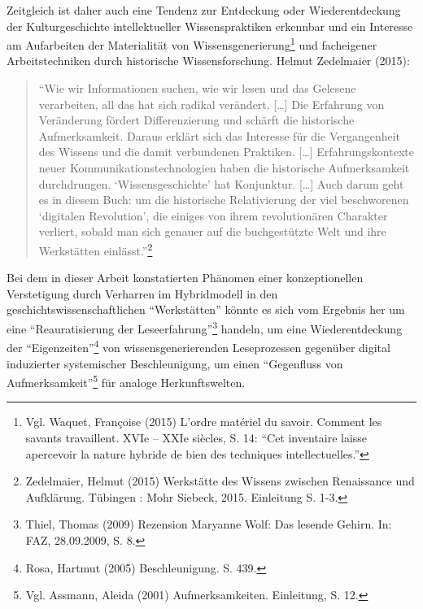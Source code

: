 \documentclass[a4paper,
fontsize=11pt,
oneside,
numbers=noperiodatend,
parskip=half-,
bibliography=totoc,
final
]{scrartcl}
\begin{document}
Zeitgleich ist daher auch eine Tendenz zur Entdeckung oder
Wiederentdeckung der Kulturgeschichte intellektueller Wissenspraktiken
erkennbar und ein Interesse am Aufarbeiten der Materialität von
Wissensgenerierung\footnote{Vgl. Waquet, Françoise (2015) L'ordre
  matériel du savoir. Comment les savants travaillent. XVIe -- XXIe
  siècles, S. 14: \enquote{Cet inventaire laisse apercevoir la nature
  hybride de bien des techniques intellectuelles.}} und facheigener
Arbeitstechniken durch historische Wissensforschung. Helmut Zedelmaier
(2015):

\begin{quote}
\enquote{Wie wir Informationen suchen, wie wir lesen und das Gelesene
verarbeiten, all das hat sich radikal verändert. {[}\ldots{}{]} Die
Erfahrung von Veränderung fördert Differenzierung und schärft die
historische Aufmerksamkeit. Daraus erklärt sich das Interesse für die
Vergangenheit des Wissens und die damit verbundenen Praktiken.
{[}\ldots{}{]} Erfahrungskontexte neuer Kommunikationstechnologien haben
die historische Aufmerksamkeit durchdrungen. \enquote{Wissensgeschichte}
hat Konjunktur. {[}\ldots{}{]} Auch darum geht es in diesem Buch: um die
historische Relativierung der viel beschworenen \enquote{digitalen
Revolution}, die einiges von ihrem revolutionären Charakter verliert,
sobald man sich genauer auf die buchgestützte Welt und ihre Werkstätten
einlässt.}\footnote{Zedelmaier, Helmut (2015) Werkstätte des Wissens
  zwischen Renaissance und Aufklärung. Tübingen : Mohr Siebeck, 2015.
  Einleitung S. 1-3.}
\end{quote}

Bei dem in dieser Arbeit konstatierten Phänomen einer konzeptionellen
Verstetigung durch Verharren im Hybridmodell in den
geschichtswissenschaftlichen \enquote{Werkstätten} könnte es sich vom
Ergebnis her um eine \enquote{Reauratisierung der
Leseerfahrung}\footnote{Thiel, Thomas (2009) Rezension Maryanne Wolf:
  Das lesende Gehirn. In: FAZ, 28.09.2009, S. 8.} handeln, um eine
Wiederentdeckung der \enquote{Eigenzeiten}\footnote{Rosa, Hartmut (2005)
  Beschleunigung. S. 439.} von wissensgenerierenden Leseprozessen
gegenüber digital induzierter systemischer Beschleunigung, um einen
\enquote{Gegenfluss von Aufmerksamkeit}\footnote{Vgl. Assmann, Aleida
  (2001) Aufmerksamkeiten. Einleitung, S. 12.} für analoge
Herkunftswelten.
\end{document}
